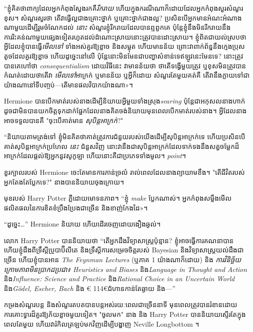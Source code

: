 “ខ្ញុំគិតថាពាក្យដែលអ្នកកំពុងស្វែងរកគឺ\emph{រីករាយ} ហើយក្នុងករណីណាក៏ដោយដែលអ្នកកំពុងសួរសំណួរខុស។ សំណួរសួរថា តើវាធ្វើល្អជាងគ្រោះថ្នាក់ ឬគ្រោះថ្នាក់ជាងល្អ? ប្រសិនបើអ្នកមានអំណះអំណាងណាមួយដើម្បីរួមចំណែកដល់ \emph{នោះ} សំណួរខ្ញុំរីករាយដែលបានឮពួកគេ ប៉ុន្តែខ្ញុំនឹងមិនរីករាយនឹងការរិះគន់ណាមួយផ្សេងទៀតរហូតដល់ដំណោះស្រាយនោះត្រូវបានដោះស្រាយ។ ខ្ញុំពិតជាយល់ស្របថាអ្វីដែលខ្ញុំបានធ្វើ\emph{មើលទៅ} ទាំងអស់គួរឱ្យខ្លាច និងសម្លុត ហើយមានន័យ ព្រោះវាពាក់ព័ន្ធនឹងក្មេងប្រុសតូចដែលគួរឱ្យខ្លាច ហើយដូច្នេះនៅលើ ប៉ុន្តែនោះមិនមែនជាបញ្ហាសំខាន់ទេឥឡូវនេះមែនទេ? នោះត្រូវបានគេហៅថា \emph{consequentialism} ដោយវិធីនេះ វាមានន័យថា ថាតើទង្វើមួយត្រូវ ឬខុសមិនត្រូវបានកំណត់ដោយថាតើវា \emph{មើលទៅ}អាក្រក់ ឬមានន័យ ឬអ្វីក៏ដោយ សំណួរតែមួយគត់គឺ តើ​វា​នឹង​ក្លាយ​ទៅ​ជា​យ៉ាង​ណា​នៅ​ទី​បញ្ចប់—តើ​មាន​ផល​វិបាក​យ៉ាង​ណា»។

Hermione បានបើកមាត់របស់នាងដើម្បីនិយាយអ្វីមួយទាំងស្រុង\emph{searing} ប៉ុន្តែជាអកុសលនាងហាក់ដូចជាមិនបានយកចិត្តទុកដាក់ផ្នែកដែលនាងគិតចង់និយាយមុនពេលបើកមាត់របស់នាង។ អ្វីដែលនាងអាចទទួលបានគឺ "ចុះបើគាត់មាន \emph{សុបិន្តអាក្រក់}?"

“និយាយតាមត្រង់ទៅ ខ្ញុំមិនគិតថាគាត់ត្រូវការជំនួយរបស់យើងដើម្បីសុបិន្តអាក្រក់ទេ ហើយប្រសិនបើគាត់សុបិន្តអាក្រក់ប្រហែល \emph{នេះ} ជំនួសវិញ នោះវានឹងជាសុបិន្តអាក្រក់ដែលទាក់ទងនឹងសត្វចម្លែកដ៏អាក្រក់ដែលផ្តល់ឱ្យអ្នកនូវសូកូឡា ហើយនោះគឺជាប្រភេទទាំងមូល។ \emph{point}។

ខួរក្បាលរបស់ Hermione ចេះតែមានការភាន់ច្រលំ រាល់ពេលដែលនាងព្យាយាមខឹង។ "តើជីវិតរបស់អ្នកតែងតែប្លែកទេ?" នាងបាននិយាយចុងក្រោយ។

មុខរបស់ Harry Potter ភ្លឺដោយមោទនភាព។ “ខ្ញុំ \emph{make} ប្លែក​ណាស់។ អ្នក​កំពុង​សម្លឹង​មើល​ផលិតផល​នៃ​ការ​ខិតខំ​ប្រឹងប្រែង​ជា​ច្រើន និង​ខាញ់​កែង​ដៃ»។

“ដូច្នេះ…” Hermione និយាយ ហើយដើរចេញដោយងឿងឆ្ងល់។

លោក Harry Potter បាននិយាយថា “តើអ្នកដឹងវិទ្យាសាស្ត្រប៉ុន្មាន? ខ្ញុំអាចធ្វើការគណនាបាន ហើយខ្ញុំដឹងពីទ្រឹស្តីប្រូបាប៊ីលីតេ និងទ្រឹស្តីការសម្រេចចិត្តរបស់ Bayesian និងវិទ្យាសាស្ត្រយល់ដឹងជាច្រើន ហើយខ្ញុំបានអាន \emph{The Feynman Lectures} (ឬភាគ 1 យ៉ាងណាក៏ដោយ) និង \emph{ការវិនិច្ឆ័យក្រោមភាពមិនប្រាកដប្រជា៖ Heuristics and Biases} និង\emph{Language in Thought and Action} និង\emph{Influence: Science and Practice} និង\emph{Rational Choice in an Uncertain World} និង\emph{Gödel, Escher, Bach} និង € 114€{ជំហានកាន់តែឆ្ងាយ} និង—”

កម្រងសំណួរបន្ត និងសំណួរតបតបានបន្តអស់រយៈពេលជាច្រើននាទី មុនពេលត្រូវបានរំខានដោយការគោះទ្វារដ៏គួរឱ្យភ័យខ្លាចមួយទៀត។ "ចូលមក" នាង និង Harry Potter បាននិយាយស្ទើរតែក្នុងពេលតែមួយ ហើយវារំកិលត្រឡប់មកវិញដើម្បីបង្ហាញ Neville Longbottom ។

